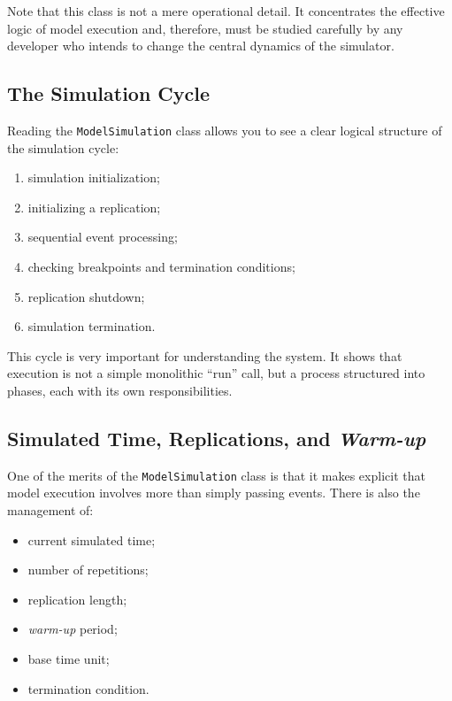Note that this class is not a mere operational detail. It concentrates the effective logic of model execution and, therefore, must be studied carefully by any developer who intends to change the central dynamics of the simulator.

\subsection{The Simulation Cycle}
\label{subsec:cap7_ciclo_da_simulacao}

Reading the \texttt{ModelSimulation} class allows you to see a clear logical structure of the simulation cycle:

\begin{enumerate}
 \item simulation initialization;
 \item initializing a replication;
 \item sequential event processing;
 \item checking breakpoints and termination conditions;
 \item replication shutdown;
 \item simulation termination.
\end{enumerate}

This cycle is very important for understanding the system. It shows that execution is not a simple monolithic ``run'' call, but a process structured into phases, each with its own responsibilities.

\subsection{Simulated Time, Replications, and \textit{Warm-up}}
\label{subsec:cap7_tempo_replications_warmup}

One of the merits of the \texttt{ModelSimulation} class is that it makes explicit that model execution involves more than simply passing events. There is also the management of:
\begin{itemize}
 \item current simulated time;
 \item number of repetitions;
 \item replication length;
 \item \textit{warm-up} period;
 \item base time unit;
 \item termination condition.
\end{itemize}

